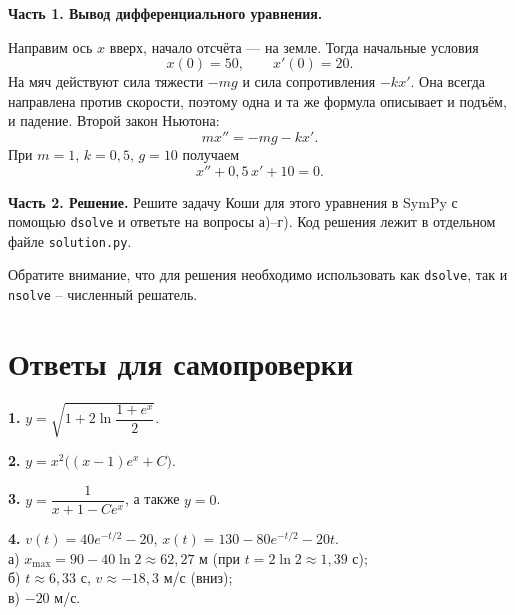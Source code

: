 \documentclass[12pt,a4paper]{article}
\begin{document}
\textbf{Часть 1. Вывод дифференциального уравнения.}

Направим ось $x$ вверх, начало отсчёта --- на земле. Тогда начальные условия
\[
x(0)=50, \qquad x'(0)=20.
\]
На мяч действуют сила тяжести $-mg$ и сила сопротивления $-kx'$. Она всегда направлена против скорости, поэтому одна и та же формула описывает и подъём, и падение. Второй закон Ньютона:
\[
m x'' = -mg - k x'.
\]
При $m=1$, $k=0{,}5$, $g=10$ получаем
\[
x'' + 0{,}5\,x' + 10 = 0.
\]

\textbf{Часть 2. Решение.}
Решите задачу Коши для этого уравнения в SymPy с помощью \texttt{dsolve} и ответьте на вопросы а)--г).
Код решения лежит в отдельном файле \texttt{solution.py}.

Обратите внимание, что для решения необходимо использовать как \texttt{dsolve}, так и \texttt{nsolve} -- численный решатель.

\newpage
\section*{Ответы для самопроверки}

\textbf{1.} $y=\sqrt{1+2\ln\dfrac{1+e^x}{2}}$.

\textbf{2.} $y=x^2\big((x-1)e^x + C\big)$.

\textbf{3.} $y=\dfrac{1}{x+1-Ce^x}$, а также $y=0$.

\textbf{4.} $v(t)=40e^{-t/2}-20$, \quad $x(t)=130-80e^{-t/2}-20t$.\\
а) $x_{\max}=90-40\ln 2\approx 62{,}27$ м (при $t=2\ln 2\approx 1{,}39$ с);\\
б) $t\approx 6{,}33$ с, $v\approx -18{,}3$ м/с (вниз);\\
в) $-20$ м/с.
\end{document}
